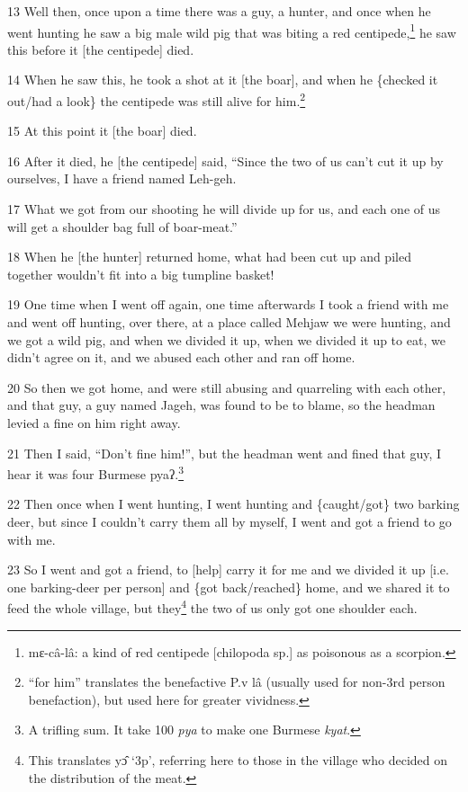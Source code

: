 13 Well then, once upon a time there was a guy, a hunter, and once when he went
hunting he saw a big male wild pig that was biting a red centipede,\footnote{mɛ-câ-lâ: a kind of red centipede [chilopoda sp.] as poisonous as a scorpion.} he saw this
before it [the centipede] died.

14 When he saw this, he took a shot at it [the boar], and when he \{checked it
out/had a look\} the centipede was still alive for him.\footnote{``for him'' translates the benefactive P.v lâ (usually used for non-3rd person benefaction), but used here for greater vividness.}

15 At this point it [the boar] died.

16 After it died, he [the centipede] said, ``Since the two of us can't cut it up
by ourselves, I have a friend named Leh-geh.

17 What we got from our shooting he will divide up for us, and each one of us will
get a shoulder bag full of boar-meat.''

18 When he [the hunter] returned home, what had been cut up and piled together
wouldn't fit into a big tumpline basket!

19 One time when I went off again, one time afterwards I took a friend with me
and went off hunting, over there, at a place called Mehjaw we were hunting, and
we got a wild pig, and when we divided it up, when we divided it up to eat, we
didn't agree on it, and we abused each other and ran off home.

20 So then we got home, and were still abusing and quarreling with each other,
and that guy, a guy named Jageh, was found to be to blame, so the headman levied
a fine on him right away.

21 Then I said, ``Don't fine him!'', but the headman went and fined that guy, I
hear it was four Burmese pyaʔ.\footnote{A trifling sum. It take 100 \textit{pya} to make one Burmese \textit{kyat}.}

22 Then once when I went hunting, I went hunting and \{caught/got\} two barking
deer, but since I couldn't carry them all by myself, I went and got a friend to
go with me.

23 So I went and got a friend, to [help] carry it for me and we divided it up [i.e.
one barking-deer per person] and \{got back/reached\} home, and we shared it to
feed the whole village, but they\footnote{This translates yɔ̂ `3p', referring here to those in the village who decided on the distribution of the meat.} the two of us only got one shoulder each.

